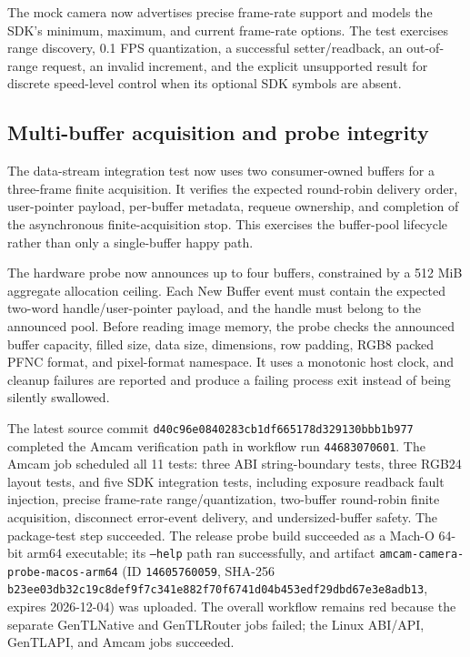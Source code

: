 \documentclass[11pt,a4paper]{report}
\begin{document}
The mock camera now advertises precise frame-rate support and models the SDK's minimum, maximum, and current frame-rate options. The test exercises range discovery, 0.1 FPS quantization, a successful setter/readback, an out-of-range request, an invalid increment, and the explicit unsupported result for discrete speed-level control when its optional SDK symbols are absent.

\subsection{Multi-buffer acquisition and probe integrity}

The data-stream integration test now uses two consumer-owned buffers for a three-frame finite acquisition. It verifies the expected round-robin delivery order, user-pointer payload, per-buffer metadata, requeue ownership, and completion of the asynchronous finite-acquisition stop. This exercises the buffer-pool lifecycle rather than only a single-buffer happy path.

The hardware probe now announces up to four buffers, constrained by a 512 MiB aggregate allocation ceiling. Each New Buffer event must contain the expected two-word handle/user-pointer payload, and the handle must belong to the announced pool. Before reading image memory, the probe checks the announced buffer capacity, filled size, data size, dimensions, row padding, RGB8 packed PFNC format, and pixel-format namespace. It uses a monotonic host clock, and cleanup failures are reported and produce a failing process exit instead of being silently swallowed.

The latest source commit \texttt{d40c96e0840283cb1df665178d329130bbb1b977} completed the Amcam verification path in workflow run \texttt{44683070601}. The Amcam job scheduled all 11 tests: three ABI string-boundary tests, three RGB24 layout tests, and five SDK integration tests, including exposure readback fault injection, precise frame-rate range/quantization, two-buffer round-robin finite acquisition, disconnect error-event delivery, and undersized-buffer safety. The package-test step succeeded. The release probe build succeeded as a Mach-O 64-bit arm64 executable; its \texttt{--help} path ran successfully, and artifact \texttt{amcam-camera-probe-macos-arm64} (ID \texttt{14605760059}, SHA-256 \texttt{b23ee03db32c19c8def9f7c341e882f70f6741d04b453edf29dbd67e3e8adb13}, expires 2026-12-04) was uploaded. The overall workflow remains red because the separate GenTLNative and GenTLRouter jobs failed; the Linux ABI/API, GenTLAPI, and Amcam jobs succeeded.
\end{document}
